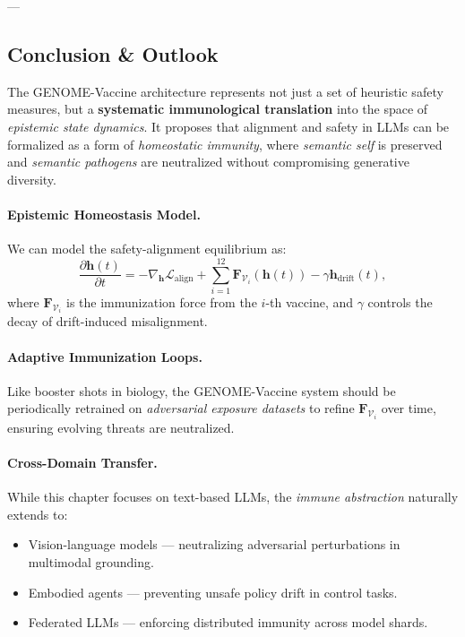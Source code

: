 ---

\subsection*{Conclusion \& Outlook}

The GENOME-Vaccine architecture represents not just a set of heuristic safety measures, but a \textbf{systematic immunological translation} into the space of \emph{epistemic state dynamics}. It proposes that alignment and safety in LLMs can be formalized as a form of \emph{homeostatic immunity}, where \emph{semantic self} is preserved and \emph{semantic pathogens} are neutralized without compromising generative diversity.

\paragraph{Epistemic Homeostasis Model.}  
We can model the safety-alignment equilibrium as:
\[
\frac{\partial \mathbf{h}(t)}{\partial t} = -\nabla_{\mathbf{h}} \mathcal{L}_\mathrm{align} + \sum_{i=1}^{12} \mathbf{F}_{\mathcal{V}_i}(\mathbf{h}(t)) - \gamma \mathbf{h}_\mathrm{drift}(t),
\]
where $\mathbf{F}_{\mathcal{V}_i}$ is the immunization force from the $i$-th vaccine, and $\gamma$ controls the decay of drift-induced misalignment.

\paragraph{Adaptive Immunization Loops.}  
Like booster shots in biology, the GENOME-Vaccine system should be periodically retrained on \emph{adversarial exposure datasets} to refine $\mathbf{F}_{\mathcal{V}_i}$ over time, ensuring evolving threats are neutralized.

\paragraph{Cross-Domain Transfer.}  
While this chapter focuses on text-based LLMs, the \emph{immune abstraction} naturally extends to:
\begin{itemize}
    \item Vision-language models — neutralizing adversarial perturbations in multimodal grounding.
    \item Embodied agents — preventing unsafe policy drift in control tasks.
    \item Federated LLMs — enforcing distributed immunity across model shards.
\end{itemize}

